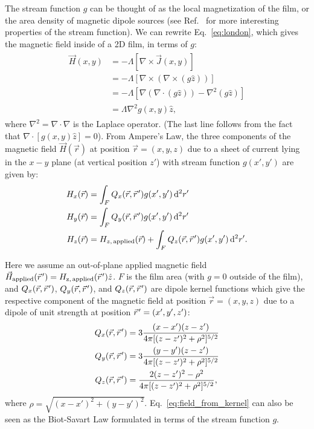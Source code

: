 \documentclass[final,3p,times,twocolumn]{elsarticle}
\newcommand{\pvec}[1]{\vec{#1}\mkern2mu\vphantom{#1}}
\newcounter{bla}
\begin{document}
The stream function $g$ can be thought of as the local magnetization of the film, or the area density of magnetic dipole sources (see Ref.~\cite{Brandt2005-wj} for more interesting properties of the stream function). We can rewrite Eq.~\ref{eq:london}, which gives the magnetic field inside of a 2D film, in terms of $g$:
\begin{align}
    \label{eq:london_stream}
    \begin{split}
        \vec{H}(x, y) &= -\Lambda\left[\nabla\times\vec{J}(x, y)\right]\\
        &= -\Lambda\left[\nabla\times\left(\nabla\times(g\hat{z})\right)\right]\\
        &= -\Lambda\left[\nabla(\nabla\cdot(g\hat{z}))-\nabla^2(g\hat{z})\right]\\
        &=\Lambda\nabla^2g(x,y)\hat{z},
    \end{split}
\end{align}
where $\nabla^2=\nabla\cdot\nabla$ is the Laplace operator. (The last line follows from the fact that $\nabla\cdot\left[g(x,y)\hat{z}\right] = 0$). From Ampere's Law, the three components of the magnetic field $\vec{H}(\vec{r})$ at position $\vec{r}=(x, y, z)$ due to a sheet of current lying in the $x-y$ plane (at vertical position $z'$) with stream function $g(x', y')$ are given by:
\begin{align}
    \label{eq:field_from_kernel}
    \begin{split}
        H_x(\vec{r}) &= \int_F Q_x(\vec{r},\pvec{r}')g(x', y')\,\mathrm{d}^2r'\\
        H_y(\vec{r}) &= \int_F Q_y(\vec{r},\pvec{r}')g(x', y')\,\mathrm{d}^2r'\\
        H_z(\vec{r}) &= H_{z,\,\mathrm{applied}}(\vec{r})
        + \int_F Q_z(\vec{r},\pvec{r}')g(x', y')\,\mathrm{d}^2r'.  
    \end{split}
\end{align}

Here we assume an out-of-plane applied magnetic field $\vec{H}_\mathrm{applied}(\pvec{r}')=H_\mathrm{z,\,\mathrm{applied}}(\pvec{r}')\hat{z}$. $F$ is the film area (with $g = 0$ outside of the film), and $Q_x(\vec{r},\pvec{r}')$, $Q_y(\vec{r},\pvec{r}')$, and $Q_z(\vec{r},\pvec{r}')$ are dipole kernel functions which give the respective component of the magnetic field at position $\vec{r}=(x, y, z)$ due to a dipole of unit strength at position $\pvec{r}'=(x', y', z')$:
\begin{align}
    \label{eq:kernels}
    \begin{split}
        Q_x(\vec{r}, \pvec{r}') &=  3\frac{(x-x')(z-z')}
        {4\pi[(z-z')^2+\rho^2]^{5/2}}\\
        Q_y(\vec{r}, \pvec{r}') &=  3\frac{(y-y')(z-z')}
        {4\pi[(z-z')^2+\rho^2]^{5/2}}\\
        Q_z(\vec{r}, \pvec{r}') &=  \frac{2(z-z')^2-\rho^2}
        {4\pi[(z-z')^2+\rho^2]^{5/2}},
    \end{split}
\end{align}
where $\rho=\sqrt{(x-x')^2 + (y-y')^2}$. Eq.~\ref{eq:field_from_kernel} can also be seen as the Biot-Savart Law formulated in terms of the stream function $g$.
\end{document}
